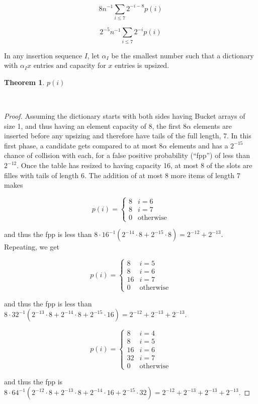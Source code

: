 \documentclass[letterpaper, 11pt]{article}
\newtheorem{theorem}{Theorem}
\begin{document}
\[
8 n^{-1} \sum_{i \le 7} 2^{-i-8}p(i)
\]

\[
2^{-5} n^{-1} \sum_{i \le 7} 2^{-i}p(i)
\]

In any insertion sequence $I$, let $\alpha_I$ be the smallest number such that a dictionary with $\alpha_I x$ entries and capacity for $x$ entries is upsized.



\begin{theorem}
  $p(i)$
\end{theorem}~\begin{proof}
Assuming the dictionary starts with both sides having Bucket arrays of size 1, and thus having an element capacity of 8, the first $8 \alpha$ elements are inserted before any upsizing and therefore have tails of the full length, 7.
In this first phase, a candidate gets compared to at most $8 \alpha$ elements and has a $2^{-15}$ chance of collision with each, for a false positive probability (``fpp'') of less than $2^{-12}$.
Once the table has resized to having capacity 16, at most 8 of the slots are filles with tails of length 6.
The addition of at most 8 more items of length 7 makes

\[
p(i) =
\begin{cases}
8 & i = 6\\
8 & i = 7\\
0 & \text{otherwise}
\end{cases}
\]

and thus the fpp is less than $8 \cdot 16^{-1} (2^{-14}\cdot 8 + 2^{-15}\cdot 8) = 2^{-12} + 2^{-13}$.
Repeating, we get

\[
p(i) =
\begin{cases}
8 & i = 5\\
8 & i = 6\\
16 & i = 7\\
0 & \text{otherwise}
\end{cases}
\]

and thus the fpp is less than $8 \cdot 32^{-1} (2^{-13}\cdot 8 + 2^{-14}\cdot 8 + 2^{-15}\cdot 16) = 2^{-12} + 2^{-13} + 2^{-13}$.

\[
p(i) =
\begin{cases}
8 & i = 4\\
8 & i = 5\\
16 & i = 6\\
32 & i = 7\\
0 & \text{otherwise}
\end{cases}
\]

and thus the fpp is $8 \cdot 64^{-1} (2^{-12}\cdot 8 + 2^{-13}\cdot 8 + 2^{-14}\cdot 16 + 2^{-15}\cdot 32) = 2^{-12} + 2^{-13} + 2^{-13} + 2^{-13}$.


\end{proof}
\end{document}
